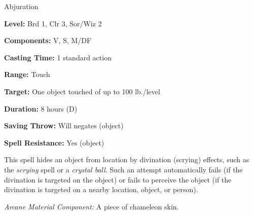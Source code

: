 
Abjuration

\textbf{Level:} Brd 1, Clr 3, Sor/Wiz 2

\textbf{Components:} V, S, M/DF

\textbf{Casting Time:} 1 standard action

\textbf{Range:} Touch

\textbf{Target:} One object touched of up to 100 lb./level

\textbf{Duration:} 8 hours (D)

\textbf{Saving Throw:} Will negates (object)

\textbf{Spell Resistance:} Yes (object)

This spell hides an object from location by divination (scrying) effects, such 
as the \textit{scrying} spell or a \textit{crystal ball}. Such an attempt automatically 
fails (if the divination is targeted on the object) or fails to perceive the object 
(if the divination is targeted on a nearby location, object, or person).

\textit{Arcane Material Component:} A piece of chameleon skin.

